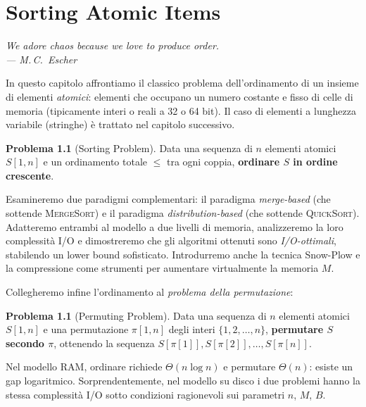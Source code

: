 \documentclass[12pt, a4paper, oneside]{book}
\theoremstyle{plain}
\theoremstyle{definition}
\newtheorem{problema}[teorema]{Problema}
\theoremstyle{remark}
\begin{document}
\chapter{Sorting Atomic Items}

\begin{flushright}
\itshape
We adore chaos because we love to produce order.\\
--- M.\,C.\ Escher
\end{flushright}

\bigskip

In questo capitolo affrontiamo il classico problema dell'ordinamento di un insieme di elementi \emph{atomici}: elementi che occupano un numero costante e fisso di celle di memoria (tipicamente interi o reali a 32 o 64 bit). Il caso di elementi a lunghezza variabile (stringhe) è trattato nel capitolo successivo.

\begin{problema}[Sorting Problem]
Data una sequenza di $n$ elementi atomici $S[1,n]$ e un ordinamento totale $\le$ tra ogni coppia, \textbf{ordinare $S$ in ordine crescente}.
\end{problema}

Esamineremo due paradigmi complementari: il paradigma \emph{merge-based} (che sottende \textsc{MergeSort}) e il paradigma \emph{distribution-based} (che sottende \textsc{QuickSort}). Adatteremo entrambi al modello a due livelli di memoria, analizzeremo la loro complessità I/O e dimostreremo che gli algoritmi ottenuti sono \emph{I/O-ottimali}, stabilendo un lower bound sofisticato. Introdurremo anche la tecnica Snow-Plow e la compressione come strumenti per aumentare virtualmente la memoria $M$.

Collegheremo infine l'ordinamento al \emph{problema della permutazione}:

\begin{problema}[Permuting Problem]
Data una sequenza di $n$ elementi atomici $S[1,n]$ e una permutazione $\pi[1,n]$ degli interi $\{1,2,\ldots,n\}$, \textbf{permutare $S$ secondo $\pi$}, ottenendo la sequenza $S[\pi[1]], S[\pi[2]], \ldots, S[\pi[n]]$.
\end{problema}

Nel modello RAM, ordinare richiede $\Theta(n\log n)$ e permutare $\Theta(n)$: esiste un gap logaritmico. Sorprendentemente, nel modello su disco i due problemi hanno la stessa complessità I/O sotto condizioni ragionevoli sui parametri $n$, $M$, $B$.
\end{document}
